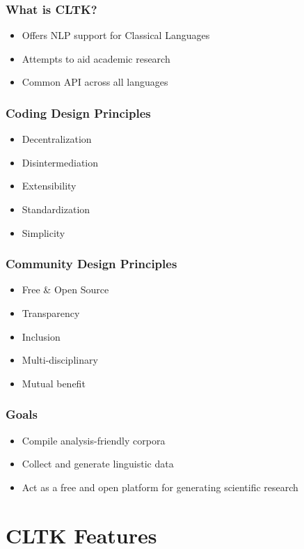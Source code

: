 \documentclass{beamer}
\begin{document}
\begin{frame}
\frametitle{What is CLTK?}
\begin{itemize}
    \item Offers NLP support for Classical Languages
    \item Attempts to aid academic research
    \item Common API across all languages
\end{itemize}
\end{frame}





\begin{frame}
\frametitle{Coding Design Principles}
\begin{itemize}
    \item Decentralization
    \item Disintermediation
    \item Extensibility
    \item Standardization
    \item Simplicity
\end{itemize}
\end{frame}





\begin{frame}
\frametitle{Community Design Principles}
\begin{itemize}
    \item Free & Open Source
    \item Transparency
    \item Inclusion
    \item Multi-disciplinary
    \item Mutual benefit
\end{itemize}
\end{frame}




\begin{frame}
\frametitle{Goals}
\begin{itemize}
    \item Compile analysis-friendly corpora
    \item Collect and generate linguistic data
    \item Act as a free and open platform for generating scientific research
\end{itemize}
\end{frame}


\section{CLTK Features}
\end{document}
